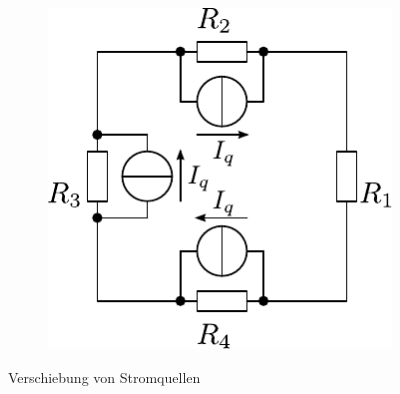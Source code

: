 \begin{figure}[h!]
\begin{subfigure}[b]{0.3\textwidth}
		\label{sch:qversch_iq2}
	\end{subfigure}
	\begin{subfigure}[b]{0.3\textwidth}
		\centering
		\includegraphics[scale=\schscalesmall]{../fig/qversch_iq3_sch.pdf}
		\label{sch:qversch_iq3}
	\end{subfigure}
	\caption{Verschiebung von Stromquellen}
	\label{sch:qversch_iq}
\end{figure}
